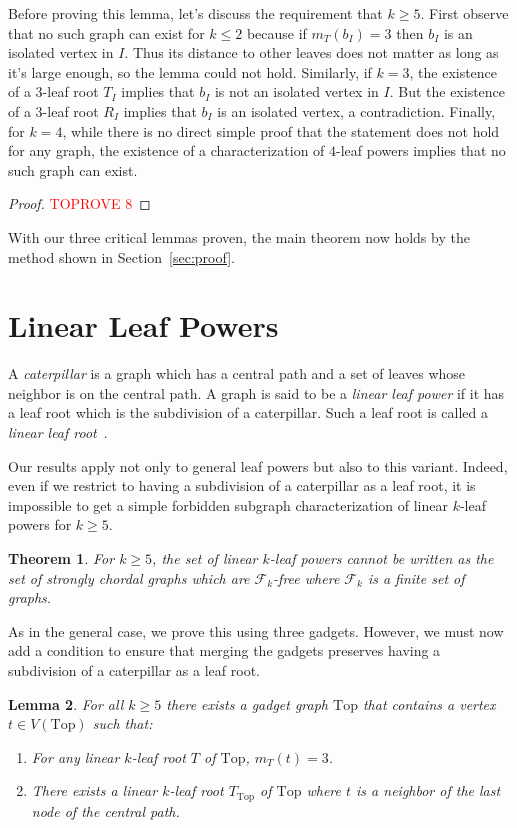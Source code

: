 \documentclass[11pt,letter]{article}
\newtheorem{theorem}{Theorem}[section]
\newtheorem{lemma}[theorem]{Lemma}
\theoremstyle{remark}
\newcommand{\T}{\text{Top}}
\newcommand{\F}{\mathscr{F}}
\begin{document}
\ind*

Before proving this lemma, let's discuss the requirement that $k\ge 5$.
First observe that no such graph can exist for $k\leq 2$ because if $m_T(b_I)=3$ then $b_I$ is an isolated vertex in $I$. Thus its distance to other leaves does not matter as long as it's large enough, so the lemma could not hold.
Similarly, if $k=3$, the existence of a $3$-leaf root $T_I$ implies that $b_I$ is not an isolated vertex in $I$. But the existence of a $3$-leaf root $R_I$ implies that $b_I$ is an isolated vertex, a contradiction. 
Finally, for $k=4$, while there is no direct simple proof that the statement does not hold for any graph, 
the existence of a characterization of $4$-leaf powers implies that no such graph can exist.

\begin{proof}\textcolor{red}{TOPROVE 8}\end{proof}
With our three critical lemmas proven, the main theorem now holds
by the method shown in Section~\ref{sec:proof}.

\section{Linear Leaf Powers}\label{sec:linear}

A {\em caterpillar} is a graph which has a central path and a set of leaves whose neighbor is on the central path. A graph is said to be a \textit{linear leaf power} if it has a leaf root which is the subdivision of a caterpillar. Such a leaf root is called a \textit{linear leaf root}~\cite{Bergougnoux}.

Our results apply not only to general leaf powers but also to this variant. Indeed, even if we restrict to having a subdivision of a caterpillar as a leaf root, it is impossible to get a simple forbidden
subgraph characterization of linear $k$-leaf powers for $k \geq 5$.

\begin{theorem}\label{thm:caterpillar}
    For $k\geq 5$, the set of linear $k$-leaf powers cannot be written as the set of strongly chordal graphs which are $\F_k$-free where $\F_k$ is a finite set of graphs.
\end{theorem}

As in the general case, we prove this using three gadgets. However, we must now add a condition to ensure that merging the gadgets preserves having a subdivision of a caterpillar as a leaf root.

\begin{lemma}\label{lem:top-caterpillar}
For all $k\geq 5$ there exists a gadget graph $\T$ that contains a vertex $t\in V(\T)$ such that:
\begin{enumerate}
        \item For any linear $k$-leaf root $T$ of $\T$, $m_{T}(t) = 3$.
        \item There exists a linear $k$-leaf root $T_{\T}$ of  $\T$ where $t$ is a neighbor of the last node of the central path.
    \end{enumerate}
\end{lemma}
\end{document}
